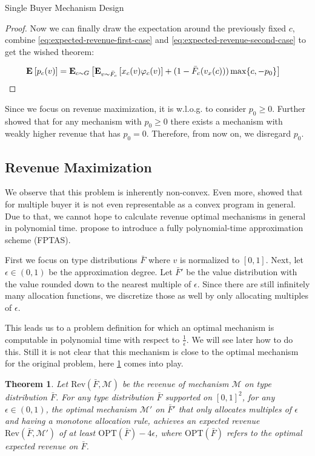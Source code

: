 \documentclass[11pt,a4paper]{article}
\newtheorem{theorem}{Theorem}
\newcommand{\Ex}[2][]{\mbox{\rm\bf E}_{#1}\left[#2\right]}
\newcommand{\1}[1]{\mbox{\rm\bf 1}_{#1}}
\begin{document}
\begin{section}{Single Buyer Mechanism Design}
\begin{proof}
     Now we can finally draw the expectation around the previously fixed $c$, combine \cref{eq:expected-revenue-first-case} and \cref{eq:expected-revenue-second-case} to get the wished theorem:

     \begin{align*}
         \Ex{p_c(v)} & = \Ex[c \sim G]{\Ex[v \sim \bar{F}_c]{x_c(v) \varphi_c(v)} + (1 - \bar{F}_{c}(v_x(c))) \max\{c, -p_0\} }
     \end{align*}
 \end{proof}

 Since we focus on revenue maximization, it is w.l.o.g. to consider $p_0 \geq 0$.
 Further \citet{primary} showed that for any mechanism with $p_0 \geq 0$ there exists a mechanism with weakly higher revenue that has $p_0 = 0$.
 Therefore, from now on, we disregard $p_0$.

 \subsection{Revenue Maximization}
 \label{sec:revenue-maximization}

 We observe that this problem is inherently non-convex.
 Even more, \citet{primary} showed that for multiple buyer it is not even representable as a convex program in general.
 Due to that, we cannot hope to calculate revenue optimal mechanisms in general in polynomial time.
 \citet{primary} propose to introduce a fully polynomial-time approximation scheme (FPTAS).

 First we focus on type distributions $\bar{F}$ where $v$ is normalized to $[0,1]$.
 Next, let $\epsilon \in (0, 1)$ be the approximation degree.
 Let $\bar{F}'$ be the value distribution with the value rounded down to the nearest multiple of $\epsilon$.
 Since there are still infinitely many allocation functions, we discretize those as well by only allocating multiples of $\epsilon$.

 This leads us to a problem definition for which an optimal mechanism is computable in polynomial time with respect to $\frac{1}{\epsilon}$.
 We will see later how to do this.
 Still it is not clear that this mechanism is close to the optimal mechanism for the original problem, here \cref{theorem:approximation-guarantee} comes into play.

 \begin{theorem}
     \label{theorem:approximation-guarantee}
     Let $\mathrm{Rev}(\bar{F}, \mathcal{M})$ be the revenue of mechanism $\mathcal{M}$ on type distribution $\bar{F}$.
     For any type distribution $\bar{F}$ supported on $[0,1]^2$, for any $\epsilon \in (0,1)$,
     the optimal mechanism $\mathcal{M}'$ on $\bar{F}'$ that only allocates multiples of $\epsilon$ and having a monotone allocation rule, achieves an expected revenue $\mathrm{Rev}(\bar{F},\mathcal{M}')$ of at least
     $\mathrm{OPT}(\bar{F}) - 4\epsilon$, where $\mathrm{OPT}(\bar{F})$ refers to the optimal expected revenue on $\bar{F}$.
 \end{theorem}


\end{section}
\end{document}
